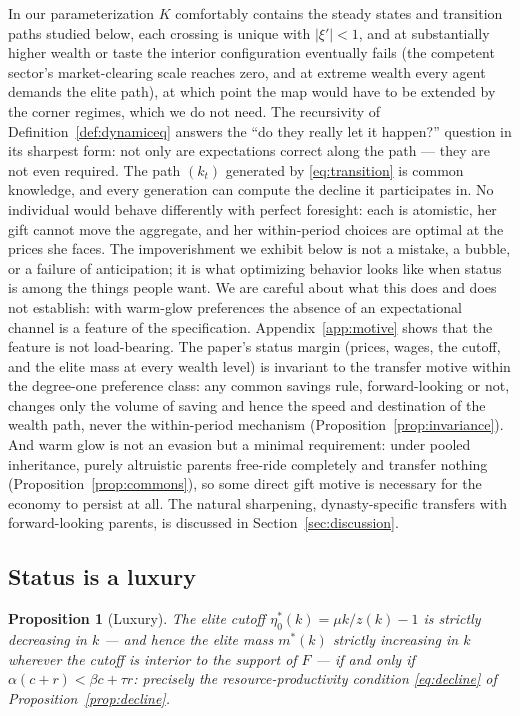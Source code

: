 \documentclass[12pt,letterpaper]{article}
\newtheorem{proposition}{Proposition}
\theoremstyle{definition}
\begin{document}
In our parameterization $K$ comfortably contains the steady states and transition paths studied below, each crossing is unique with $|\xi'|<1$, and at substantially higher wealth or taste the interior configuration eventually fails (the competent sector's market-clearing scale reaches zero, and at extreme wealth every agent demands the elite path), at which point the map would have to be extended by the corner regimes, which we do not need.
The recursivity of Definition~\ref{def:dynamiceq} answers the ``do they really let it happen?'' question in its sharpest form: not only are expectations correct along the path --- they are not even required.
The path $(k_t)$ generated by \eqref{eq:transition} is common knowledge, and every generation can compute the decline it participates in.
No individual would behave differently with perfect foresight: each is atomistic, her gift cannot move the aggregate, and her within-period choices are optimal at the prices she faces.
The impoverishment we exhibit below is not a mistake, a bubble, or a failure of anticipation; it is what optimizing behavior looks like when status is among the things people want.
We are careful about what this does and does not establish: with warm-glow preferences the absence of an expectational channel is a feature of the specification.
Appendix~\ref{app:motive} shows that the feature is not load-bearing.
The paper's status margin (prices, wages, the cutoff, and the elite mass at every wealth level) is invariant to the transfer motive within the degree-one preference class: any common savings rule, forward-looking or not, changes only the volume of saving and hence the speed and destination of the wealth path, never the within-period mechanism (Proposition~\ref{prop:invariance}).
And warm glow is not an evasion but a minimal requirement: under pooled inheritance, purely altruistic parents free-ride completely and transfer nothing (Proposition~\ref{prop:commons}), so some direct gift motive is necessary for the economy to persist at all.
The natural sharpening, dynasty-specific transfers with forward-looking parents, is discussed in Section~\ref{sec:discussion}.

\subsection{Status is a luxury}

\begin{proposition}[Luxury]\label{prop:luxury} The elite cutoff $\eta^\ast_0(k)=\mu k/z(k)-1$ is strictly decreasing in $k$ --- and hence the elite mass $m^\ast(k)$ strictly increasing in $k$ wherever the cutoff is interior to the support of $F$ --- if and only if $\alpha(c+r) < \beta c + \tau r$: precisely the resource-productivity condition \eqref{eq:decline} of Proposition~\ref{prop:decline}.
\end{proposition}
\end{document}
